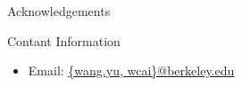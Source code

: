 \documentclass[final]{beamer}
\newlength{\onecolwid}
\begin{document}
\begin{frame}[t]
\begin{columns}[t]
\begin{column}{\onecolwid}
\begin{block}{Acknowledgements}
\end{block}







\begin{block}{Contant Information}

\begin{itemize}
\item Email: \href{mailto:wang.yu@berkeley.edu, wcai@berkeley.edu}{\{wang.yu, wcai\}@berkeley.edu}
\end{itemize}


\end{block}


\end{column} %

\end{columns} %

\end{frame} %
\end{document}
